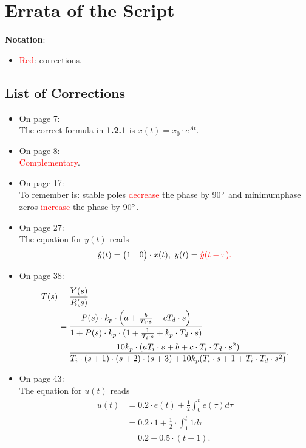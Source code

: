 \documentclass[a4paper,12 pt]{article}
\numberwithin{equation}{section}
\theoremstyle{definition}
\theoremstyle{remark}
\theoremstyle{definition}
\theoremstyle{definition}
\theoremstyle{definition}
\theoremstyle{remark}
\begin{document}
\section*{Errata of the Script}
\textbf{Notation}:
\begin{itemize}
\item \textcolor{red}{Red}: corrections.
\end{itemize}
\subsection*{List of Corrections}
\begin{itemize}
\item On page 7: \\
The correct formula in \textbf{1.2.1} is $x(t)=x_0 \cdot e^{At}$.
\item On page 8: \\
\textcolor{red}{Complementary}.
\item On page 17: \\
To remember is: stable poles \textcolor{red}{decrease} the phase by 90$\degree$ and minimumphase zeros \textcolor{red}{increase} the phase by $ 90\degree$.
\item On page 27: \\
The equation for $y(t)$ reads
\begin{equation*}
\hat{y}(t)=\begin{pmatrix}
1&0
\end{pmatrix} \cdot x(t), \  y(t)=\textcolor{red}{\hat{y}(t-\tau).}
\end{equation*}
\item On page 38:\\
\begin{equation*}
\begin{equation*}
\begin{split}
T(s)&=\frac{Y(s)}{R(s)}\\
&= \frac{P(s) \cdot k_p \cdot \left( a+\frac{b}{T_i \cdot s}+cT_d\cdot s \right)}{1+P(s)\cdot k_p\cdot (1+\frac{1}{T_i \cdot s}+k_p\cdot T_d \cdot s)}\\
&= \frac{10k_p\cdot (aT_i\cdot s + b + c\cdot T_i \cdot T_d \cdot s^2)}{T_i\cdot (s+1)\cdot (s+2)\cdot (s+3) + 10k_p(T_i\cdot s+1+T_i\cdot T_d \cdot s^2)}.
\end{split}
\end{equation*}
\item On page 43: \\
The equation for $u(t)$ reads
\begin{equation*}
\begin{split}
u(t)&=0.2\cdot e(t) +\frac{1}{2} \int_0^te(\tau)d\tau\\
&=0.2\cdot 1 + \frac{1}{2} \cdot \int_1^t 1 d \tau\\
&= 0.2+ 0.5 \cdot (t-1).
\end{split}
\end{equation*}

\end{itemize}
\end{document}
